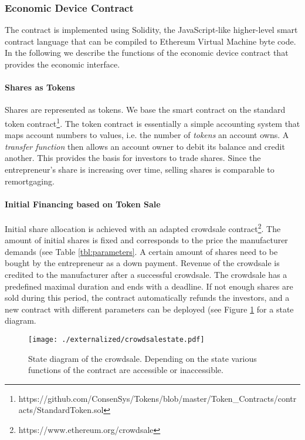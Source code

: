 \subsubsection{Economic Device Contract}

The contract is implemented using Solidity, the JavaScript-like higher-level smart contract language that can be compiled to Ethereum Virtual Machine byte code. In the following we describe the functions of the economic device contract that provides the economic interface.

\paragraph{Shares as Tokens}

Shares are represented as tokens. We base the smart contract on the standard token contract\footnote{https://github.com/ConsenSys/Tokens/blob/master/Token\_Contracts/contracts/StandardToken.sol}. The token contract is essentially a simple accounting system that maps account numbers to values, i.e. the number of \emph{tokens} an account owns. A \emph{transfer function} then allows an account owner to debit its balance and credit another. This provides the basis for investors to trade shares. Since the entrepreneur's share is increasing over time, selling shares is comparable to remortgaging.

\paragraph{Initial Financing based on Token Sale}

Initial share allocation is achieved with an adapted crowdsale contract\footnote{https://www.ethereum.org/crowdsale}. The amount of initial shares is fixed and corresponds to the price the manufacturer demands (see Table \ref{tbl:parameters}. A certain amount of shares need to be bought by the entrepreneur as a down payment. Revenue of the crowdsale is credited to the manufacturer after a successful crowdsale. The crowdsale has a predefined maximal duration and ends with a deadline. If not enough shares are sold during this period, the contract automatically refunds the investors, and a new contract with different parameters can be deployed (see Figure \ref{fig:crowdSalesStates} for a state diagram.

\begin{figure}
 \centering
 \texttt{[image: ./externalized/crowdsalestate.pdf]}
 \caption{State diagram of the crowdsale. Depending on the state various functions of the contract are accessible or inaccessible.}
 \label{fig:crowdSalesStates}
 \end{figure}

